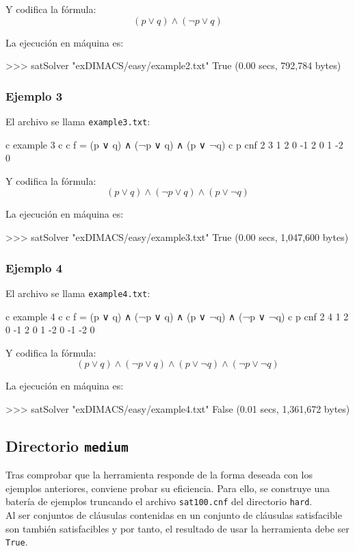 Y codifica la fórmula:
$$(p \vee q) \wedge (\neg p \vee q)$$

La ejecución en máquina es:
\begin{code}
>>> satSolver "exDIMACS/easy/example2.txt"
True
(0.00 secs, 792,784 bytes)
\end{code}
\subsubsection{Ejemplo 3}
El archivo se llama \texttt{example3.txt}:
\begin{codigo}
c example 3
c 
c f = (p ∨ q) ∧ (¬p ∨ q) ∧ (p ∨ ¬q)
c
p cnf 2 3
1 2 0
-1 2 0
1 -2 0
\end{codigo}

Y codifica la fórmula:
$$(p \vee q)\wedge (\neg p \vee q)\wedge ( p \vee \neg q)$$

La ejecución en máquina es:
\begin{code}
>>> satSolver "exDIMACS/easy/example3.txt"
True
(0.00 secs, 1,047,600 bytes)
\end{code}
\subsubsection{Ejemplo 4}
El archivo se llama \texttt{example4.txt}:
\begin{codigo}
c example 4
c 
c f = (p ∨ q) ∧ (¬p ∨ q) ∧ (p ∨ ¬q) ∧ (¬p ∨ ¬q)
c
p cnf 2 4
1 2 0
-1 2 0
1 -2 0
-1 -2 0
\end{codigo}

Y codifica la fórmula:
$$(p \vee q)\wedge (\neg p \vee q)\wedge ( p \vee \neg q)\wedge (\neg p \vee \neg q)$$

La ejecución en máquina es:
\begin{code}
>>> satSolver "exDIMACS/easy/example4.txt"
False
(0.01 secs, 1,361,672 bytes)
\end{code}

\subsection{Directorio \texttt{medium}}
Tras comprobar que la herramienta responde de la forma deseada con los ejemplos anteriores, conviene probar su eficiencia. Para ello, se construye una batería de ejemplos truncando el archivo \texttt{sat100.cnf} del directorio \texttt{hard}. \\

Al ser conjuntos de cláusulas contenidas en un conjunto de cláusulas satisfacible son también satisfacibles y por tanto, el resultado de usar la herramienta debe ser \texttt{True}.\\

